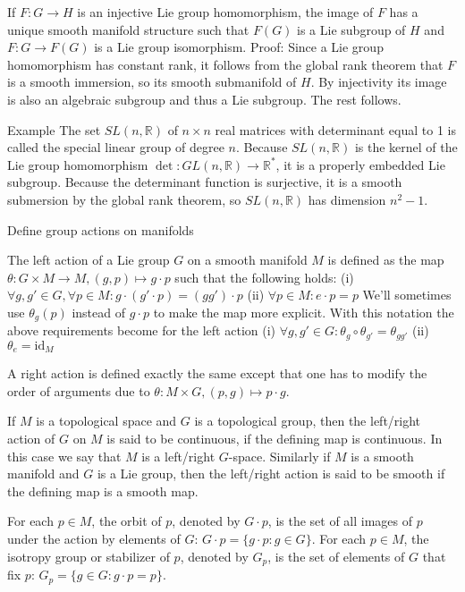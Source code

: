 If \( F : G \to H \) is an injective Lie group homomorphism, the image of 
\( F \) has a unique smooth manifold structure such that \( F(G) \) is a Lie subgroup
of \( H \) and \( F : G \to F(G) \) is a Lie group isomorphism.
Proof:
Since a Lie group homomorphism has constant rank, it follows from the
global rank theorem that \( F \) is a smooth immersion, so its smooth submanifold of \( H \). 
By injectivity its image is also an algebraic subgroup and thus a Lie subgroup. The rest follows.

Example
 The set \(SL(n, \mathbb{R})\) of \(n \times n\) real matrices with determinant equal to 1 is called the special linear group of degree \(n\). 
 Because \(SL(n, \mathbb{R})\) is the kernel of the Lie group homomorphism \(\det: GL(n, \mathbb{R}) \to \mathbb{R}^*\), 
 it is a properly embedded Lie subgroup. 
 Because the determinant function is surjective, it is a smooth submersion by the global rank theorem,
 so \(SL(n, \mathbb{R})\) has dimension \(n^2 - 1\).


Define group actions on manifolds

The left action of a Lie group \(G\) on a smooth manifold \(M\) is defined as the map \(\theta: G \times M \to M, (g, p) \mapsto g \cdot p\) 
such that the following holds:
(i) \(\forall g, g' \in G, \forall p \in M: g \cdot (g' \cdot p) = (gg') \cdot p\)
(ii) \(\forall p \in M: e \cdot p = p\)
We'll sometimes use \(\theta_g(p)\) instead of \(g \cdot p\) to make the map more explicit. 
With this notation the above requirements become for the left action
(i) \(\forall g, g' \in G: \theta_g \circ \theta_{g'} = \theta_{gg'}\)
(ii) \(\theta_e = \text{id}_M\)

A right action is defined exactly the same except that one has to modify the order of arguments due to \( \theta : M \times G, (p, g) \mapsto p \cdot g \).

If \(M\) is a topological space and \(G\) is a topological group, then the left/right action of \(G\) on \(M\) is said to be continuous, 
if the defining map is continuous. In this case we say that \(M\) is a left/right \(G\)-space. 
Similarly if \(M\) is a smooth manifold and \(G\) is a Lie group, then the left/right action is said to be smooth if the defining map is a smooth map.

For each \(p \in M\), the orbit of \(p\), denoted by \(G \cdot p\), is the set of all images of \(p\) under the action by elements of \(G\):
\(G \cdot p = \{g \cdot p : g \in G\}.\)
For each \(p \in M\), the isotropy group or stabilizer of \(p\), denoted by \(G_p\), 
is the set of elements of \(G\) that fix \(p\):
\(G_p = \{g \in G : g \cdot p = p\}.\)

